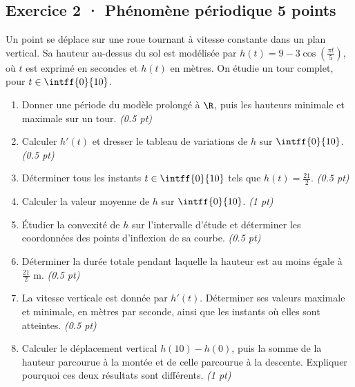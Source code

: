 \subsection*{Exercice 2 · Phénomène périodique \hfill 5 points}Un point se déplace sur une roue tournant à vitesse constante dans un plan vertical. Sa hauteur au-dessus du sol est modélisée par $h(t)=9-3\cos\left(\frac{\pi t}{5}\right)$, où $t$ est exprimé en secondes et $h(t)$ en mètres. On étudie un tour complet, pour $t\in\intff{0}{10}$.

\begin{enumerate}

\item Donner une période du modèle prolongé à $\R$, puis les hauteurs minimale et maximale sur un tour. \hfill\textit{(\num{0,5} pt)}

\item Calculer $h'(t)$ et dresser le tableau de variations de $h$ sur $\intff{0}{10}$. \hfill\textit{(\num{0,5} pt)}

\item Déterminer tous les instants $t\in\intff{0}{10}$ tels que $h(t)=\frac{21}{2}$. \hfill\textit{(\num{0,5} pt)}

\item Calculer la valeur moyenne de $h$ sur $\intff{0}{10}$. \hfill\textit{(1 pt)}

\item Étudier la convexité de $h$ sur l'intervalle d'étude et déterminer les coordonnées des points d'inflexion de sa courbe. \hfill\textit{(\num{0,5} pt)}

\item Déterminer la durée totale pendant laquelle la hauteur est au moins égale à $\frac{21}{2}$ m. \hfill\textit{(\num{0,5} pt)}

\item La vitesse verticale est donnée par $h'(t)$. Déterminer ses valeurs maximale et minimale, en mètres par seconde, ainsi que les instants où elles sont atteintes. \hfill\textit{(\num{0,5} pt)}

\item Calculer le déplacement vertical $h(10)-h(0)$, puis la somme de la hauteur parcourue à la montée et de celle parcourue à la descente. Expliquer pourquoi ces deux résultats sont différents. \hfill\textit{(1 pt)}

\end{enumerate}

\mxnewpage{}

